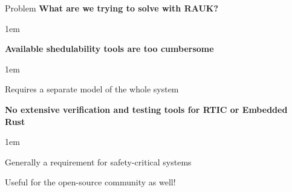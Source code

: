 \begin{frame}{Problem}
    \textbf{What are we trying to solve with RAUK?}
    \vspace{1em}
    \begin{itemize-size}{1em}
        \item \textbf{Available shedulability tools are too cumbersome}
            \begin{itemize-size}{1em}
                \item Requires a separate model of the whole system 
            \end{itemize-size}
        \item \textbf{No extensive verification and testing tools for RTIC or Embedded Rust}
            \begin{itemize-size}{1em}
                \item Generally a requirement for safety-critical systems 
                \item Useful for the open-source community as well!
            \end{itemize-size}
        
    \end{itemize-size}
    
\end{frame}
